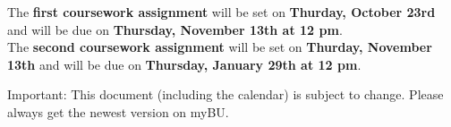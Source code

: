 \documentclass[a4paper,12pt]{article}
\begin{document}
The \textbf{first coursework assignment} will be set on \textbf{Thurday, October 23rd} and will be due on \textbf{Thursday, November 13th at 12 pm}. \\

The \textbf{second coursework assignment} will be set on \textbf{Thurday, November 13th} and will be due on \textbf{Thursday, January 29th at 12 pm}. 

Important: This document (including the calendar) is subject to change. Please always get the newest version on myBU.
\end{document}
